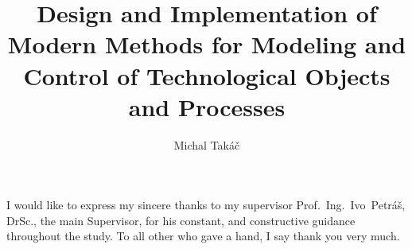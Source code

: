 \documentclass[]{tukethesis}
\author{Michal Takáč}
\title{Design and Implementation of Modern Methods for Modeling and Control of Technological Objects and Processes}
\subtitle{}
\begin{document}
\renewcommand\theHfigure{\theHsection.\arabic{figure}}
\renewcommand\theHtable{\theHsection.\arabic{table}}

\firstpage

\titlepage


%
%

\abstrakte %

\abstrakt %

\endabstract %

\assignthesis

\declaration

\acknowledgement %
I would like to express my sincere thanks to my supervisor Prof.~Ing.~Ivo~Petráš, DrSc., the main Supervisor, for his constant, and constructive guidance
throughout the study. To all other who gave a hand, I say thank you
very much.
\endacknowledgement
\end{document}
